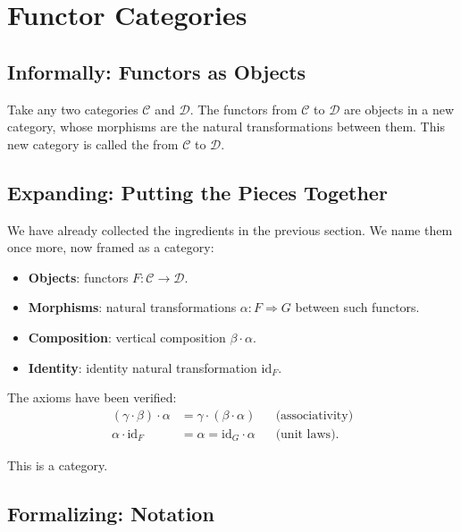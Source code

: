 \section{Functor Categories}
\label{sec:functor-cats}

\subsection{Informally: Functors as Objects}

Take any two categories $\mathcal{C}$ and $\mathcal{D}$. The functors from
$\mathcal{C}$ to $\mathcal{D}$ are objects in a new category, whose
morphisms are the natural transformations between them. This new category
is called the  from $\mathcal{C}$ to $\mathcal{D}$.

\subsection{Expanding: Putting the Pieces Together}

We have already collected the ingredients in the previous section. We name
them once more, now framed as a category:

\begin{itemize}
  \item \textbf{Objects}: functors $F : \mathcal{C} \to \mathcal{D}$.
  \item \textbf{Morphisms}: natural transformations $\alpha : F \Rightarrow G$
        between such functors.
  \item \textbf{Composition}: vertical composition $\beta \cdot \alpha$.
  \item \textbf{Identity}: identity natural transformation $\mathrm{id}_F$.
\end{itemize}

The axioms have been verified:
\begin{align*}
  (\gamma \cdot \beta) \cdot \alpha
    &= \gamma \cdot (\beta \cdot \alpha)
    && \text{(associativity)} \\
  \alpha \cdot \mathrm{id}_F
    &= \alpha
    = \mathrm{id}_G \cdot \alpha
    && \text{(unit laws)}.
\end{align*}

This is a category.

\subsection{Formalizing: Notation}

